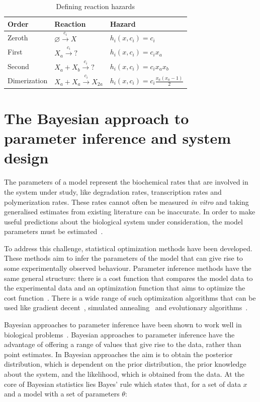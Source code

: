 \begin{table}[h]
\centering
\caption{Defining reaction hazards}
\label{tab:hazards}
\begin{tabular}{@{}lll@{}}
\toprule
Order & Reaction & Hazard \\ \midrule
Zeroth & $\varnothing \xrightarrow{c_i}X $ & $h_i(x, c_i) = c_i$ \\
First & $X_a \xrightarrow{c_i} ? $ & $h_i(x, c_i) = c_{i}x_a$ \\
Second & $X_a + X_b \xrightarrow{c_i} ? $ & $h_i(x, c_i) = c_{i}x_{a}x_b$ \\
Dimerization & $X_a + X_a \xrightarrow{c_i} X_{2a} $ & $h_i(x, c_i) = c_{i}\frac{x_{a}(x_{a}-1)}{2}$ \\ \bottomrule
\end{tabular}
\end{table}


\section{The Bayesian approach to parameter inference and system design}

The parameters of a model represent the biochemical rates that are involved in the system under study, like degradation rates, transcription rates and polymerization rates. These rates cannot often be measured \textit{in vitro} and taking generalised estimates from existing literature can be inaccurate. In order to make useful predictions about the biological system under consideration, the model parameters must be estimated~\autocite{Zheng:2010bp}. 

To address this challenge, statistical optimization methods have been developed. These methods aim to infer the parameters of the model that can give rise to some experimentally observed behaviour. Parameter inference methods have the same general structure: there is a cost function that compares the model data to the experimental data and an optimization function that aims to optimize the cost function~\autocite{Toni:2010}. There is a wide range of such optimization algorithms that can be used like gradient decent~\autocite{Levenberg:1944we, Marquardt:1963wr}, simulated annealing~\autocite{Kirkpatrick:1983kv} and evolutionary algorithms~\autocite{Onbasoglu:2001um, Wood:2002uo}.  

Bayesian approaches to parameter inference have been shown to work well in biological problems~\autocite{Barnes:2011hh, Toni:2010, Liepe:2014iw}. Bayesian approaches to parameter inference have the advantage of offering a range of values that give rise to the data, rather than point estimates. In Bayesian approaches the aim is to obtain the posterior distribution, which is dependent on the prior distribution, the prior knowledge about the system, and the likelihood, which is obtained from the data. At the core of Bayesian statistics lies Bayes' rule which states that, for a set of data $x$ and a model with a set of parameters $θ$:

